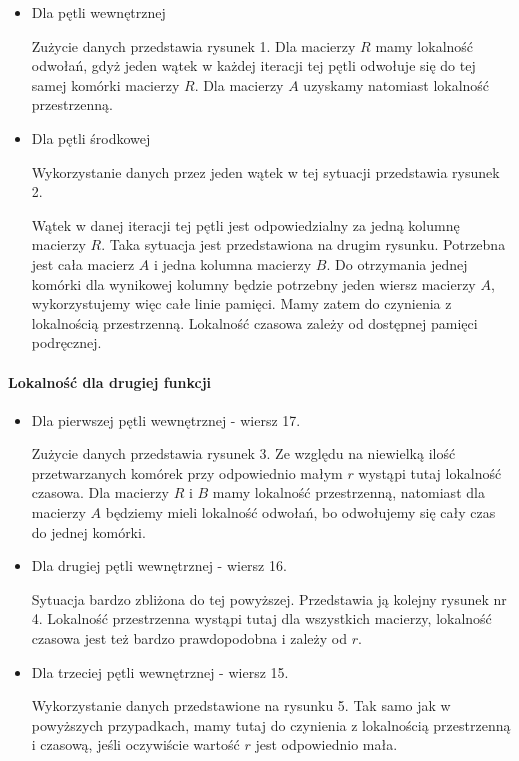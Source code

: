 \documentclass{article}
\begin{document}
\begin{itemize}

\item Dla pętli wewnętrznej

Zużycie danych przedstawia rysunek 1. Dla macierzy $R$ mamy lokalność odwołań, gdyż jeden wątek w każdej iteracji tej pętli odwołuje się do tej samej komórki macierzy $R$. Dla macierzy $A$ uzyskamy natomiast lokalność przestrzenną.

\item Dla pętli środkowej

Wykorzystanie danych przez jeden wątek w tej sytuacji przedstawia rysunek 2. 

Wątek w danej iteracji tej pętli jest odpowiedzialny za jedną kolumnę macierzy $R$. Taka sytuacja jest przedstawiona na drugim rysunku. Potrzebna jest cała macierz $A$ i jedna kolumna macierzy $B$. Do otrzymania jednej komórki dla wynikowej kolumny będzie potrzebny jeden wiersz macierzy $A$, wykorzystujemy więc całe linie pamięci. Mamy zatem do czynienia z lokalnością przestrzenną. Lokalność czasowa zależy od dostępnej pamięci podręcznej.

\end{itemize}

\paragraph{Lokalność dla drugiej funkcji}

\begin{itemize}

\item Dla pierwszej pętli wewnętrznej - wiersz 17.

Zużycie danych przedstawia rysunek 3. Ze względu na niewielką ilość przetwarzanych komórek przy odpowiednio małym $r$ wystąpi tutaj lokalność czasowa. Dla macierzy $R$ i $B$ mamy lokalność przestrzenną, natomiast dla macierzy $A$ będziemy mieli lokalność odwołań, bo odwołujemy się cały czas do jednej komórki.

\item Dla drugiej pętli wewnętrznej - wiersz 16.

Sytuacja bardzo zbliżona do tej powyższej. Przedstawia ją kolejny rysunek nr 4. Lokalność przestrzenna wystąpi tutaj dla wszystkich macierzy, lokalność czasowa jest też bardzo prawdopodobna i zależy od $r$.

\item Dla trzeciej pętli wewnętrznej - wiersz 15.

Wykorzystanie danych przedstawione na rysunku 5. Tak samo jak w powyższych przypadkach, mamy tutaj do czynienia z lokalnością przestrzenną i czasową, jeśli oczywiście wartość $r$ jest odpowiednio mała.

\end{itemize}
\end{document}
